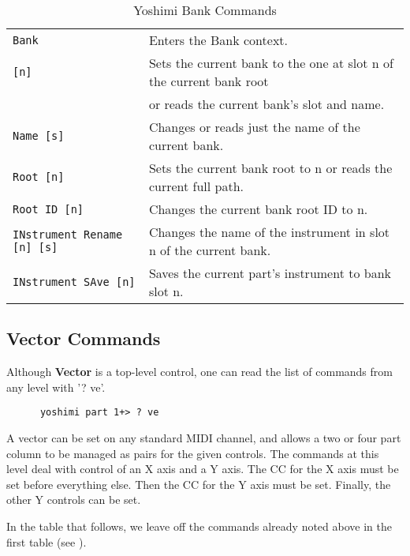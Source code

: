    \begin{table}[H]
      \centering
      \caption{Yoshimi Bank Commands}
      \label{table:yoshimi_text_bank_commands}
      \begin{tabular}{l l}

   \texttt{Bank} &
   Enters the Bank context. \\
   \texttt{[n]} &
   Sets the current bank to the one at slot n of the current bank root \\
   \texttt{  } &
   or reads the current bank's slot and name. \\
  \texttt{Name [s]} &
  Changes or reads just the name of the current bank. \\
  \texttt{Root [n]} &
  Sets the current bank root to n or reads the current full path. \\
  \texttt{Root ID [n]} &
  Changes the current bank root ID to n.  \\
  \texttt{INstrument Rename [n] [s]} &
  Changes the name of the instrument in slot n of the current bank.  \\
  \texttt{INstrument SAve [n]} &
  Saves the current part's instrument to bank slot n.  \\

        \end{tabular}
   \end{table}

\subsection{Vector Commands}
\label{subsec:command_line_vector_command_list}

   Although \textbf{Vector} is a top-level control, one can read the list of
   commands from any level with '? ve'.

   \begin{verbatim}
      yoshimi part 1+> ? ve
   \end{verbatim}
   A vector can be set on any standard MIDI channel, and allows a two or four
   part column to be managed as pairs for the given controls.
   The commands at this level deal with control of an X axis and a Y axis.
   The CC for the X axis must be set before everything else.  Then the CC for
   the Y axis must be set.  Finally, the other Y controls can be set.

   In the table that follows, we leave off the commands already noted
   above in the first table
   (see ).

